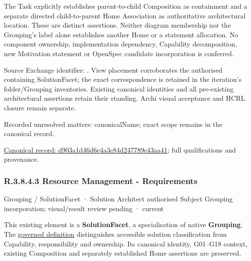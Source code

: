 The Task explicitly establishes parent-to-child Composition as containment and
a separate directed child-to-parent Home Association as authoritative architectural
location. These are distinct assertions. Neither diagram membership nor the
Grouping's label alone establishes another Home or a statement allocation.
No component ownership, implementation dependency, Capability decomposition,
new Motivation statement or OpenSpec candidate incorporation is conferred.



Source Exchange identifier: \texttt{}. View placement corroborates
the authorised containing SolutionFacet; the exact correspondence is retained in the
iteration's folder/Grouping inventories. Existing canonical identities and all
pre-existing architectural assertions retain their standing. Archi visual
acceptance and HCRL closure remain separate.


{\small Recorded unresolved matters: canonicalName; exact scope remains in the canonical record.}\par
{\footnotesize \href{../../../../../../../continuum/grouping/d903a1d46d6e4a3c84d247789e43aa41.md}{Canonical record: d903a1d46d6e4a3c84d247789e43aa41}; full qualifications and provenance.}\par
\subsubsection*{R.3.8.4.3 Resource Management - Requirements}
\label{navigation:R.3.8.4.3}

\label{element:eef79a8840434bd6b6fd37ab4f8ff75d}
{\small Grouping / SolutionFacet · Solution Architect authorised Subject Grouping incorporation; visual/result review pending · current}\par

This existing element is a \textbf{SolutionFacet}, a specialisation of native
\textbf{Grouping}. The \href{\detokenize{../../../../../../../governance/continuum-representation.md#solutionfacet-classification--1119-candidate}}{governed definition}
distinguishes accessible solution classification from Capability, responsibility
and ownership. Its canonical identity, G01–G18 context, existing Composition
and separately established Home assertions are preserved.




